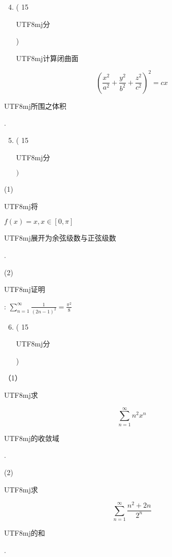 \documentclass[10pt]{article}
\begin{document}
\begin{enumerate}
  \setcounter{enumi}{3}
  \item ( 15 \begin{CJK}{UTF8}{mj}分\end{CJK}) \begin{CJK}{UTF8}{mj}计算闭曲面\end{CJK}
\end{enumerate}
$$
\left(\frac{x^{2}}{a^{2}}+\frac{y^{2}}{b^{2}}+\frac{z^{2}}{c^{2}}\right)^{2}=c x
$$
\begin{CJK}{UTF8}{mj}所围之体积\end{CJK}.

\begin{enumerate}
  \setcounter{enumi}{4}
  \item ( 15 \begin{CJK}{UTF8}{mj}分\end{CJK} $)$
\end{enumerate}
(1) \begin{CJK}{UTF8}{mj}将\end{CJK} $f(x)=x, x \in[0, \pi]$ \begin{CJK}{UTF8}{mj}展开为余弦级数与正弦级数\end{CJK}.

(2) \begin{CJK}{UTF8}{mj}证明\end{CJK}: $\sum_{n=1}^{\infty} \frac{1}{(2 n-1)^{2}}=\frac{\pi^{2}}{8}$

\begin{enumerate}
  \setcounter{enumi}{5}
  \item ( 15 \begin{CJK}{UTF8}{mj}分\end{CJK})
\end{enumerate}
（1）\begin{CJK}{UTF8}{mj}求\end{CJK}
$$
\sum_{n=1}^{\infty} n^{2} x^{n}
$$
\begin{CJK}{UTF8}{mj}的收敛域\end{CJK}.

(2) \begin{CJK}{UTF8}{mj}求\end{CJK}
$$
\sum_{n=1}^{\infty} \frac{n^{2}+2 n}{2^{n}}
$$
\begin{CJK}{UTF8}{mj}的和\end{CJK}.
\end{document}
